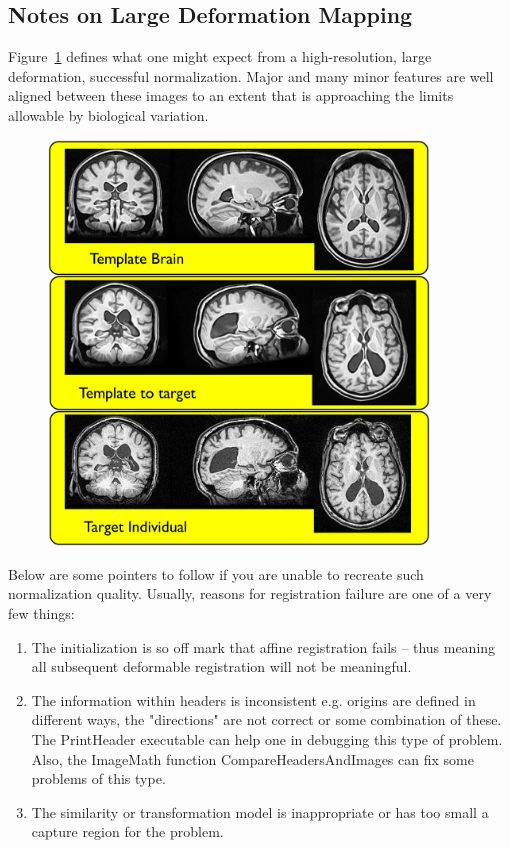 \documentclass{InsightArticle}
\begin{document}
\subsection{Notes on Large Deformation Mapping} 
Figure~\ref{fig:large} defines what one might expect from a 
high-resolution, large deformation, successful normalization.  
Major and many minor features are well aligned between 
these images to an extent that is approaching the limits 
allowable by biological variation.  
\begin{figure}
\includegraphics[width=0.9\textwidth]{Figures/ANTSLargeDef.jpg} 
\label{fig:large}
\end{figure}
Below are some pointers to follow if you are unable to recreate such normalization quality.  
Usually, reasons for registration failure are one of a very few things: 
\begin{enumerate}
\item The initialization is so off mark that affine registration fails -- thus meaning all subsequent deformable registration will not be meaningful.
\item The information within headers is inconsistent e.g. origins are defined in different ways, the "directions" are not correct or some combination of these.    The PrintHeader executable can help one in debugging this type of problem.  Also, the ImageMath function CompareHeadersAndImages can fix some problems of this type. 
\item  The similarity or transformation model is inappropriate or has too small a capture region for the problem. 
\end{enumerate}
\end{document}
